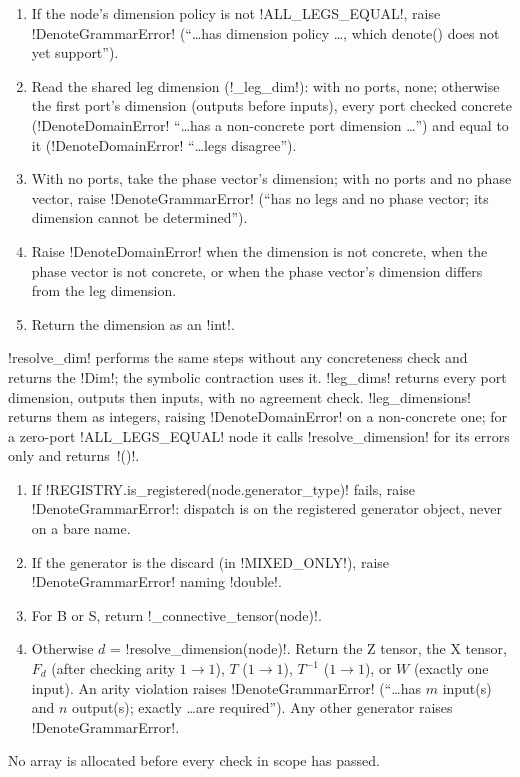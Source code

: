 \begin{algorithm}\label{alg:semantics-resolve}
\begin{enumerate}
\item If the node's dimension policy is not \py!ALL_LEGS_EQUAL!, raise \py!DenoteGrammarError! (``\ldots has dimension policy \ldots, which denote() does not yet support'').
\item Read the shared leg dimension (\py!_leg_dim!): with no ports, none; otherwise the first port's dimension (outputs before inputs), every port checked concrete (\py!DenoteDomainError! ``\ldots has a non-concrete port dimension \ldots'') and equal to it (\py!DenoteDomainError! ``\ldots legs disagree'').
\item With no ports, take the phase vector's dimension; with no ports and no phase vector, raise \py!DenoteGrammarError! (``has no legs and no phase vector; its dimension cannot be determined'').
\item Raise \py!DenoteDomainError! when the dimension is not concrete, when the phase vector is not concrete, or when the phase vector's dimension differs from the leg dimension.
\item Return the dimension as an \py!int!.
\end{enumerate}
\end{algorithm}

\py!resolve_dim! performs the same steps without any concreteness check and returns the \py!Dim!; the symbolic contraction uses it. \py!leg_dims! returns every port dimension, outputs then inputs, with no agreement check. \py!leg_dimensions! returns them as integers, raising \py!DenoteDomainError! on a non-concrete one; for a zero-port \py!ALL_LEGS_EQUAL! node it calls \py!resolve_dimension! for its errors only and returns~\py!()!.

\begin{algorithm}\label{alg:semantics-denote}
\begin{enumerate}
\item If \py!REGISTRY.is_registered(node.generator_type)! fails, raise \py!DenoteGrammarError!: dispatch is on the registered generator object, never on a bare name.
\item If the generator is the discard (in \py!MIXED_ONLY!), raise \py!DenoteGrammarError! naming \py!double!.
\item For B or S, return \py!_connective_tensor(node)!.
\item Otherwise $d$ = \py!resolve_dimension(node)!. Return the Z tensor, the X tensor, $F_d$ (after checking arity $1\to1$), $T$ ($1\to1$), $T^{-1}$ ($1\to1$), or $W$ (exactly one input). An arity violation raises \py!DenoteGrammarError! (``\ldots has $m$ input(s) and $n$ output(s); exactly \ldots are required''). Any other generator raises \py!DenoteGrammarError!.
\end{enumerate}
No array is allocated before every check in scope has passed.
\end{algorithm}

